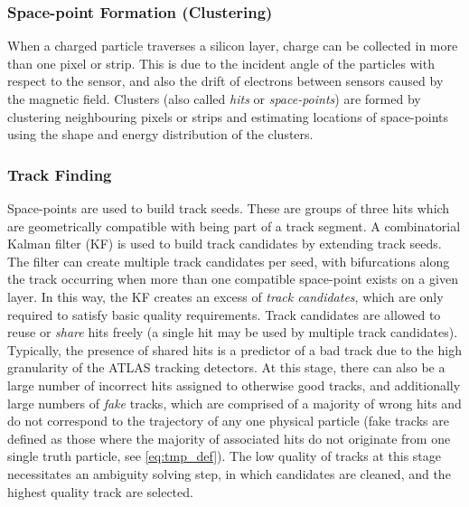 
\subsubsection{Space-point Formation (Clustering)}
When a charged particle traverses a silicon layer, charge can be collected in more than one pixel or strip.
This is due to the incident angle of the particles with respect to the sensor, and also the drift of electrons between sensors caused by the magnetic field.
Clusters (also called \textit{hits} or \textit{space-points}) are formed by clustering neighbouring pixels or strips and estimating locations of space-points using the shape and energy distribution of the clusters.

\subsubsection{Track Finding}
Space-points are used to build track seeds. These are groups of three hits which are geometrically compatible with being part of a track segment.
A combinatorial Kalman filter (KF) is used to build track candidates by extending track seeds.
The filter can create multiple track candidates per seed, with bifurcations along the track occurring when more than one compatible space-point exists on a given layer.
In this way, the KF creates an excess of \textit{track candidates}, which are only required to satisfy basic quality requirements. 
Track candidates are allowed to reuse or \textit{share} hits freely (a single hit may be used by multiple track candidates).
Typically, the presence of shared hits is a predictor of a bad track due to the high granularity of the ATLAS tracking detectors.
At this stage, there can also be a large number of incorrect hits assigned to otherwise good tracks, and additionally large numbers of \textit{fake} tracks, which are comprised of a majority of wrong hits and do not correspond to the trajectory of any one physical particle (fake tracks are defined as those where the majority of associated hits do not originate from one single truth particle, see \cref{eq:tmp_def}).
The low quality of tracks at this stage necessitates an ambiguity solving step, in which candidates are cleaned, and the highest quality track are selected.

